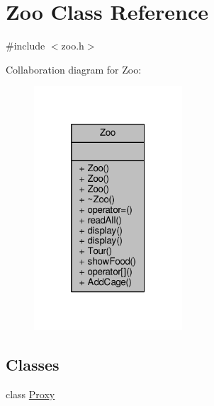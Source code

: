 \hypertarget{classZoo}{}\section{Zoo Class Reference}
\label{classZoo}


{\ttfamily \#include $<$zoo.\+h$>$}



Collaboration diagram for Zoo\+:
\nopagebreak
\begin{figure}[H]
\begin{center}
\leavevmode
\includegraphics[width=157pt]{classZoo__coll__graph}
\end{center}
\end{figure}
\subsection*{Classes}
\begin{DoxyCompactItemize}
\item 
class \hyperlink{classZoo_1_1Proxy}{Proxy}
\end{DoxyCompactItemize}
